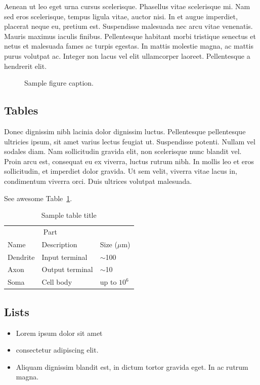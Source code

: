 \documentclass{article}
\begin{document}
Aenean ut leo eget urna cursus scelerisque. Phasellus vitae scelerisque mi. Nam sed eros scelerisque, tempus ligula vitae, auctor nisi. In et augue imperdiet, placerat neque eu, pretium est. Suspendisse malesuada nec arcu vitae venenatis. Mauris maximus iaculis finibus. Pellentesque habitant morbi tristique senectus et netus et malesuada fames ac turpis egestas. In mattis molestie magna, ac mattis purus volutpat ac. Integer non lacus vel elit ullamcorper laoreet. Pellentesque a hendrerit elit. 

\begin{figure}
  \centering
  \fbox{\rule[-.5cm]{4cm}{4cm} \rule[-.5cm]{4cm}{0cm}}
  \caption{Sample figure caption.}
  \label{fig:fig2}
\end{figure}

\subsection{Tables}
Donec dignissim nibh lacinia dolor dignissim luctus. Pellentesque pellentesque ultricies ipsum, sit amet varius lectus feugiat ut. Suspendisse potenti. Nullam vel sodales diam. Nam sollicitudin gravida elit, non scelerisque nunc blandit vel. Proin arcu est, consequat eu ex viverra, luctus rutrum nibh. In mollis leo et eros sollicitudin, et imperdiet dolor gravida. Ut sem velit, viverra vitae lacus in, condimentum viverra orci. Duis ultrices volutpat malesuada. 


See awesome Table~\ref{tab:table}.

\begin{table}
 \caption{Sample table title}
  \centering
  \begin{tabular}{lll}
    \toprule
    \multicolumn{2}{c}{Part}                   \\
    \cmidrule(r){1-2}
    Name     & Description     & Size ($\mu$m) \\
    \midrule
    Dendrite & Input terminal  & $\sim$100     \\
    Axon     & Output terminal & $\sim$10      \\
    Soma     & Cell body       & up to $10^6$  \\
    \bottomrule
  \end{tabular}
  \label{tab:table}
\end{table}

\subsection{Lists}
\begin{itemize}
\item Lorem ipsum dolor sit amet
\item consectetur adipiscing elit. 
\item Aliquam dignissim blandit est, in dictum tortor gravida eget. In ac rutrum magna.
\end{itemize}
\end{document}
